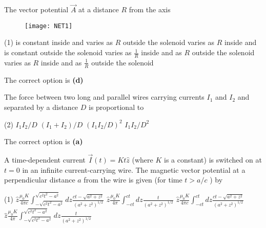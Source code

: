 \begin{enumerate}
\begin{minipage}{\textwidth}
	The vector potential $\vec{A}$ at a distance $R$ from the axis
	\begin{figure}[H]
		\centering
		\texttt{[image: NET1]}
	\end{figure}
\end{minipage}
\begin{tasks}(1)
	\task[\textbf{A.}]is constant inside and varies as $R$ outside the solenoid
	\task[\textbf{B.}] varies as $R$ inside and is constant outside the solenoid
	\task[\textbf{C.}]varies as $\frac{1}{R}$ inside and as $R$ outside the solenoid
	\task[\textbf{D.}]varies as $R$ inside and as $\frac{1}{R}$ outside the solenoid
\end{tasks}
\begin{answer}
	The correct option is \textbf{(d)}
\end{answer}
\begin{minipage}{\textwidth}
	\item The force between two long and parallel wires carrying currents $I_{1}$ and $I_{2}$ and separated by a distance $D$ is proportional to
\end{minipage}
\begin{tasks}(2)
	\task[\textbf{A.}] $I_{1} I_{2} / D$
	\task[\textbf{B.}]$\left(I_{1}+I_{2}\right) / D$
	\task[\textbf{C.}]$\left(I_{1} I_{2} / D\right)^{2}$
	\task[\textbf{D.}]$I_{1} I_{2} / D^{2}$
\end{tasks}
\begin{answer}
	The correct option is \textbf{(a)}	
\end{answer}
\begin{minipage}{\textwidth}
	\item A time-dependent current $\vec{I}(t)=K t \hat{z}$ (where $K$ is a constant) is switched on at $t=0$ in an infinite current-carrying wire. The magnetic vector potential at a perpendicular distance $a$ from the wire is given (for time $t>a / c$ ) by
\end{minipage}
\begin{tasks}(1)
	\task[\textbf{A.}] $\hat{z} \frac{\mu_{0} K}{4 \pi c} \int_{-\sqrt{c^{2} t^{2}-a^{2}}}^{\sqrt{c^{2} t^{2}-a^{2}}} d z \frac{c t-\sqrt{a^{2}+z^{2}}}{\left(a^{2}+z^{2}\right)^{1 / 2}}$
	\task[\textbf{B.}] $\hat{z} \frac{\mu_{0} K}{4 \pi} \int_{-c t}^{c t} d z \frac{t}{\left(a^{2}+z^{2}\right)^{1 / 2}}$
	\task[\textbf{C.}] $\hat{z} \frac{\mu_{0} K}{4 \pi c} \int_{-c t}^{c t} d z \frac{c t-\sqrt{a^{2}+z^{2}}}{\left(a^{2}+z^{2}\right)^{1 / 2}}$
	\task[\textbf{D.}] $\hat{z} \frac{\mu_{0} K}{4 \pi} \int_{-\sqrt{c^{2} t^{2}-a^{2}}}^{\sqrt{c^{2} t^{2}-a^{2}}} d z \frac{t}{\left(a^{2}+z^{2}\right)^{1 / 2}}$

\end{tasks}
\end{enumerate}

